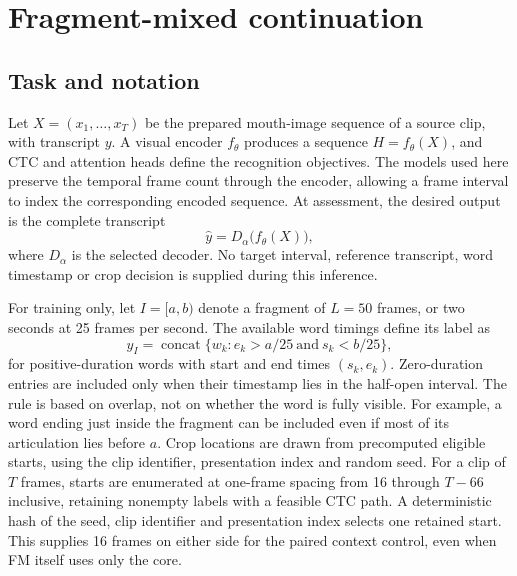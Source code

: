 \section{Fragment-mixed continuation}
\label{sec:method}
\subsection{Task and notation}
Let $X=(x_1,\ldots,x_T)$ be the prepared mouth-image sequence of a source clip,
with transcript $y$. A visual encoder $f_\theta$ produces a sequence
$H=f_\theta(X)$, and CTC and attention heads define the recognition objectives.
The models used here preserve the temporal frame count through the encoder,
allowing a frame interval to index the corresponding encoded sequence.
At assessment, the desired output is the complete transcript
\begin{equation}
    \hat y = D_\alpha\bigl(f_\theta(X)\bigr),
    \label{eq:inference}
\end{equation}
where $D_\alpha$ is the selected decoder. No target interval, reference transcript,
word timestamp or crop decision is supplied during this inference.

For training only, let $I=[a,b)$ denote a fragment of $L=50$ frames, or two seconds
at 25 frames per second. The available word timings define its label as
\begin{equation}
 y_I = \operatorname{concat}\{w_k:
        e_k>a/25\ \text{and}\ s_k<b/25\},
 \label{eq:overlap}
\end{equation}
for positive-duration words with start and end times $(s_k,e_k)$.
Zero-duration entries are included only when their timestamp lies in the half-open
interval. The rule is based on overlap, not on whether the word is fully visible.
For example, a word ending just inside the fragment can be included even if most
of its articulation lies before $a$. Crop locations are drawn from precomputed
eligible starts, using the clip identifier, presentation index and random seed.
For a clip of $T$ frames, starts are enumerated at one-frame spacing from 16
through $T-66$ inclusive, retaining nonempty labels with a feasible CTC path.
A deterministic hash of the seed, clip identifier and presentation index selects
one retained start. This supplies 16 frames on either side for the paired context
control, even when FM itself uses only the core.

